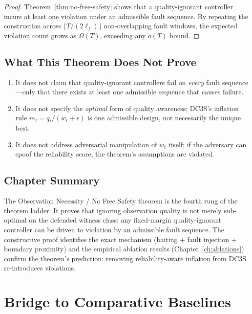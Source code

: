 \begin{proof}
Theorem~\ref{thm:no-free-safety} shows that a quality-ignorant controller
incurs at least one violation under an admissible fault sequence.  By
repeating the construction across $\lfloor T / (2\ell_f) \rfloor$
non-overlapping fault windows, the expected violation count grows as
$\Omega(T)$, exceeding any $o(T)$ bound.
\end{proof}

\subsection{What This Theorem Does Not Prove}

\begin{enumerate}
  \item It does not claim that quality-ignorant controllers fail on
    \emph{every} fault sequence---only that there exists at least one
    admissible sequence that causes failure.
  \item It does not specify the \emph{optimal} form of quality awareness;
    DC3S's inflation rule $m_t = q_t/(w_t + \epsilon)$ is one
    admissible design, not necessarily the unique best.
  \item It does not address adversarial manipulation of $w_t$ itself;
    if the adversary can spoof the reliability score, the theorem's
    assumptions are violated.
\end{enumerate}

\subsection{Chapter Summary}

The Observation Necessity / No Free Safety theorem is the fourth rung of the theorem ladder.
It proves that ignoring observation quality is not merely sub-optimal on the
defended witness class: any fixed-margin quality-ignorant controller can be
driven to violation by an admissible fault sequence.  The constructive proof
identifies the exact mechanism (baiting + fault injection + boundary
proximity) and the empirical ablation results
(Chapter~\ref{ch:ablations}) confirm the theorem's prediction: removing
reliability-aware inflation from DC3S re-introduces violations.



\section*{Bridge to Comparative Baselines}

